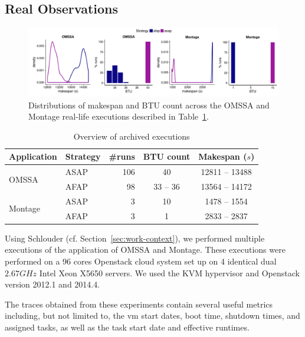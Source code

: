 \documentclass[]{llncs}
\begin{document}
\subsection{Real Observations}
\begin{figure}
	\centering
	\includegraphics[width=\textwidth]{gfx/real_plot.pdf}
	\caption[caption]{Distributions of makespan and BTU count across the OMSSA and 
	  Montage real-life executions described in Table~\ref{tab:nbruns}.%
	  }
	\label{fig:realbrs}
\end{figure}
\begin{table} \centering \caption{Overview of archived
	executions}\label{tab:nbruns} 
	\begin{tabular}{llrcc} \toprule
		Application&Strategy&\#runs&BTU count&Makespan ($s$)\\
		\midrule 
		\multirow{2}{*}{OMSSA}&ASAP&106&40&12811 -- 13488\\
				      &AFAP&98&33 -- 36&13564 -- 14172\\ 
		\midrule 
		\multirow{2}{*}{Montage}&ASAP&3&10&1478 -- 1554\\
				        &AFAP&3&1&2833 -- 2837\\
		\bottomrule 
	\end{tabular} 
\end{table}




Using Schlouder (cf. Section~\ref{sec:work-context}),
we performed multiple executions of the
application of OMSSA and Montage. These executions were performed on a 96 cores
Openstack cloud system set up on 4 identical dual $2.67GHz$ Intel Xeon X5650
servers. We used the KVM hypervisor and Openstack version 2012.1 and 2014.4.

The traces obtained  from  these  experiments contain  several
useful metrics  including, but  not limited  to, the  \ac{vm} start  dates, boot
time, shutdown  times, and assigned  tasks, as well as  the task start  date and
effective  runtimes.
\end{document}
